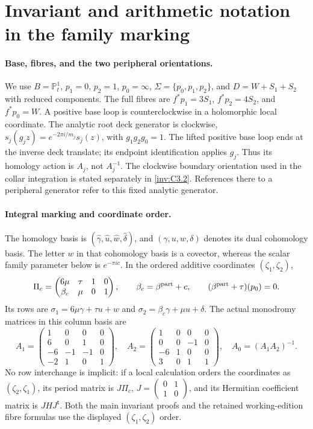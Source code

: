\section{Invariant and arithmetic notation in the family marking}
\label{inv:notation-dictionary}

\paragraph{Base, fibres, and the two peripheral orientations.}
We use $B=\mathbb P^1_t$, $p_1=0$, $p_2=1$, $p_0=\infty$,
$\Sigma=\{p_0,p_1,p_2\}$, and $D=W+S_1+S_2$ with reduced
components. The full fibres are $f^*p_1=3S_1$, $f^*p_2=4S_2$,
and $f^*p_0=W$. A positive base loop is counterclockwise in a
holomorphic local coordinate. The analytic root deck generator is
clockwise, $s_j(g_jz)=e^{-2\pi i/m_j}s_j(z)$, with
$g_1g_2g_0=1$. The lifted positive base loop ends at the inverse deck
translate; its endpoint identification applies $g_j$. Thus its
homology action is $A_j$, not $A_j^{-1}$.
The clockwise boundary orientation used in the collar integration
is stated separately in \cref{inv:C3.2}. References there to a
peripheral generator refer to this fixed analytic generator.

\paragraph{Integral marking and coordinate order.}
The homology basis is
$(\hat\gamma,\hat u,\hat w,\hat\delta)$, and
$(\gamma,u,w,\delta)$ denotes its dual cohomology basis.
The letter $w$ in that cohomology basis is a covector, whereas the
scalar family parameter below is $e^{-\pi ic}$.
In the ordered additive coordinates $(\zeta_1,\zeta_2)$,
\[
 \Pi_c=\begin{pmatrix}6\mu&\tau&1&0\\
             \beta_c&\mu&0&1\end{pmatrix},
 \qquad \beta_c=\beta^{\rm part}+c,
 \qquad (\beta^{\rm part}+\tau)(p_0)=0.
\]
Its rows are $\sigma_1=6\mu\gamma+\tau u+w$ and
$\sigma_2=\beta_c\gamma+\mu u+\delta$.
The actual monodromy matrices in this column basis are
\[
 A_1=\begin{pmatrix}1&0&0&0\\6&0&1&0\\-6&-1&-1&0\\-2&1&0&1\end{pmatrix},
 \quad
 A_2=\begin{pmatrix}1&0&0&0\\0&0&-1&0\\-6&1&0&0\\3&0&1&1\end{pmatrix},
 \quad A_0=(A_1A_2)^{-1}.
\]
No row interchange is implicit: if a local calculation orders the
coordinates as $(\zeta_2,\zeta_1)$, its period matrix is
$J\Pi_c$, $J=\left(\begin{smallmatrix}0&1\\1&0\end{smallmatrix}\right)$,
and its Hermitian coefficient matrix is $JH J^{\mathsf t}$.
Both the main invariant proofs and the retained working-edition
fibre formulas use the displayed $(\zeta_1,\zeta_2)$ order.

